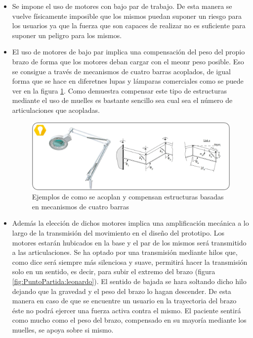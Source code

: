 \begin{itemize}
    \item Se impone el uso de motores con bajo par de trabajo. De esta manera se vuelve físicamente imposible que los mismos puedan suponer un riesgo para los usuarios ya que la fuerza que son capaces de realizar no es suficiente para suponer un peligro para los mismos.
    \item El uso de motores de bajo par implica una compensación del peso del propio brazo de forma que los motores deban cargar con el meonr peso posible. Eso se consigue a través de mecanismos de cuatro barras acoplados, de igual forma que se hace en diferetnes lupas y lámparas comerciales como se puede ver en la figura \ref{fig:PuntoPartida:CuatroBarras}. Como demuestra \cite{Rahman_asimple} compensar este tipo de estructuras mediante el uso de muelles es bastante sencillo sea cual sea el número de articulaciones que acopladas.
    \begin{figure}
    	\centering
    	\includegraphics[width=1\textwidth]{figuras/Imagenes_PuntoPartida/CuatroBarras.jpg}
    	\caption{Ejemplos de como se acoplan y compensan estructuras basadas en mecanismos de cuatro barras}
    	\label{fig:PuntoPartida:CuatroBarras}
    \end{figure}
    \item Además la elección de dichos motores implica una amplificación mecánica a lo largo de la transmisión del movimiento en el diseño del prototipo. Los motores estarán hubicados en la base y el par de los mismos será transmitido a las articulaciones. Se ha optado por una transmisión mediante hilos que, como dice \cite{LeonardoCodice} será siempre más silenciosa y suave, permitirá hacer la transmisión solo en un sentido, es decir, para subir el extremo del brazo (figura \ref{fig:PuntoPartida:leonardo}). El sentido de bajada se hara soltando dicho hilo dejando que la gravedad y el peso del brazo lo hagan descender. De esta manera en caso de que se encuentre un usuario en la trayectoria del brazo éste no podrá ejercer una fuerza activa contra el mismo. El paciente sentirá como mucho como el peso del brazo, compensado en su mayoría mediante los muelles, se apoya sobre si mismo.

\end{itemize}
